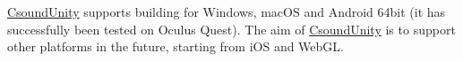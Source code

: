 \mbox{\hyperlink{class_csound_unity}{Csound\+Unity}} supports building for Windows, mac\+OS and Android 64bit (it has successfully been tested on Oculus Quest). The aim of \mbox{\hyperlink{class_csound_unity}{Csound\+Unity}} is to support other platforms in the future, starting from i\+OS and Web\+GL. 